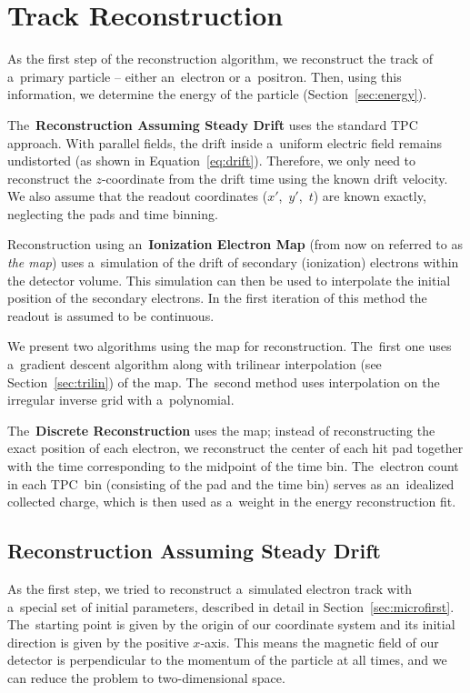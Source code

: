 \chapter{Track Reconstruction}
\label{sec:track}
	As the first step of the reconstruction algorithm, we reconstruct the track of a~primary particle -- either an~electron or a~positron. Then, using this information, we determine the energy of the particle (Section~\ref{sec:energy}).
	
	The~\textbf{Reconstruction Assuming Steady Drift} uses the standard \ac{TPC} approach. With parallel fields, the drift inside a~uniform electric field remains undistorted (as shown in Equation~\ref{eq:drift}). Therefore, we only need to reconstruct the $z$\nobreakdash-coordinate from the drift time using the known drift velocity. We also assume that the readout coordinates ($x'$,~$y'$,~$t$) are known exactly, neglecting the pads and time binning.
	
	Reconstruction using an~\textbf{Ionization Electron Map} (from now on referred to as \emph{the map}) uses a~simulation of the drift of secondary (ionization) electrons within the detector volume. This simulation can then be used to interpolate the initial position of the secondary electrons. In the first iteration of this method the readout is assumed to be continuous.
	
	We present two algorithms using the map for reconstruction. The~first one uses a~gradient descent algorithm along with trilinear interpolation (see Section~\ref{sec:trilin}) of the map. The~second method uses interpolation on the irregular inverse grid with a~polynomial.
	
	The~\textbf{Discrete Reconstruction} uses the map; instead of reconstructing the exact position of each electron, we reconstruct the center of each hit pad together with the time corresponding to the midpoint of the time bin. The~electron count in each \ac{TPC}~bin (consisting of the pad and the time bin) serves as an~idealized collected charge, which is then used as a~weight in the energy reconstruction fit.
	
	\section{Reconstruction Assuming Steady Drift}
	\label{sec:trackfirst}
		As the first step, we tried to reconstruct a~simulated electron track with a~special set of initial parameters, described in detail in Section~\ref{sec:microfirst}. The~starting point is given by the origin of our coordinate system and its initial direction is given by the positive $x$\nobreakdash-axis. This means the magnetic field of our detector is perpendicular to the momentum of the particle at all times, and we can reduce the problem to two-dimensional space.
		
